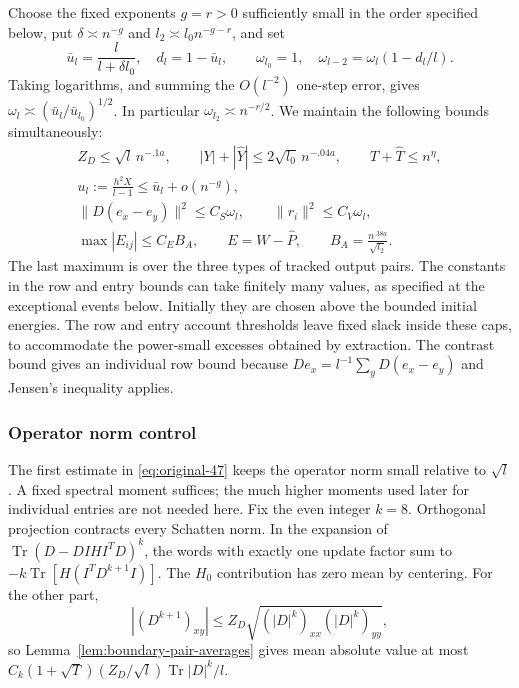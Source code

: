 Choose the fixed exponents $g=r>0$ sufficiently small in the order
specified below, put $\delta\asymp n^{-g}$ and
$l_2\asymp l_0n^{-g-r}$, and set
\[
 \bar u_l=\frac{l}{l+\delta l_0},\quad d_l=1-\bar u_l,
 \qquad \omega_{l_0}=1,
 \quad \omega_{l-2}=\omega_l(1-d_l/l).
\]
Taking logarithms, and summing the $O(l^{-2})$ one-step error, gives
$\omega_l\asymp(\bar u_l/\bar u_{l_0})^{1/2}$.
In particular $\omega_{l_2}\asymp n^{-r/2}$.
We maintain the following bounds simultaneously:
\begin{equation}
 \begin{gathered}
 Z_D\le\sqrt l\,n^{-.1a},\qquad
 |Y|+|\widehat Y|\le2\sqrt{l_0}\,n^{-.04a},
 \qquad T+\widehat T\le n^\eta,\\
 u_l:=\frac{h^2X}{l-1}\le\bar u_l+o(n^{-g}),\\
 \|D(e_x-e_y)\|^2\le C_S\omega_l,
 \qquad \|r_i\|^2\le C_V\omega_l,\\
 \max|E_{ij}|\le C_EB_A,\qquad
 E=W-\widehat P,\qquad B_A=\frac{n^{.38a}}{\sqrt{l_2}}.
 \end{gathered}
 \label{eq:original-47}
\end{equation}
The last maximum is over the three types of tracked output pairs.
The constants in the row and entry bounds can take finitely many
values, as specified at the exceptional events below.  Initially
they are chosen above the bounded initial energies.  The row and entry
account thresholds leave fixed slack inside these caps, to accommodate
the power-small excesses obtained by extraction.  The contrast
bound gives an individual row bound because
$De_x=l^{-1}\sum_yD(e_x-e_y)$ and Jensen's inequality applies.

\subsubsection*{Operator norm control}
The first estimate in \eqref{eq:original-47} keeps the operator norm
small relative to $\sqrt l$.  A fixed spectral moment suffices; the much
higher moments used later for individual entries are not needed here.
Fix the even integer $k=8$.
Orthogonal projection contracts every Schatten norm.  In the expansion
of $\operatorname{Tr}(D-DIHI^TD)^k$, the words with exactly one update
factor sum to $-k\operatorname{Tr}[H(I^TD^{k+1}I)]$.
The $H_0$ contribution has zero mean by centering.  For the other part,
\[
 |(D^{k+1})_{xy}|
 \le Z_D\sqrt{(|D|^k)_{xx}(|D|^k)_{yy}},
\]
so Lemma~\ref{lem:boundary-pair-averages} gives mean absolute value
at most
$C_k(1+\sqrt T)(Z_D/\sqrt l)\operatorname{Tr}|D|^k/l$.

